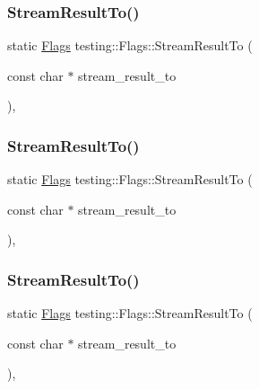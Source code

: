 \mbox{\label{structtesting_1_1_flags_a9cf0f64310b28eadbbfbb35584ebfc71}} 
\subsubsection{\texorpdfstring{StreamResultTo()}{StreamResultTo()}\hspace{0.1cm}{\footnotesize\ttfamily [1/3]}}
{\footnotesize\ttfamily static \mbox{\hyperlink{structtesting_1_1_flags}{Flags}} testing\+::\+Flags\+::\+Stream\+Result\+To (\begin{DoxyParamCaption}\item[{const char $\ast$}]{stream\+\_\+result\+\_\+to }\end{DoxyParamCaption})\hspace{0.3cm}{\ttfamily [inline]}, {\ttfamily [static]}}

\mbox{\label{structtesting_1_1_flags_a9cf0f64310b28eadbbfbb35584ebfc71}} 
\subsubsection{\texorpdfstring{StreamResultTo()}{StreamResultTo()}\hspace{0.1cm}{\footnotesize\ttfamily [2/3]}}
{\footnotesize\ttfamily static \mbox{\hyperlink{structtesting_1_1_flags}{Flags}} testing\+::\+Flags\+::\+Stream\+Result\+To (\begin{DoxyParamCaption}\item[{const char $\ast$}]{stream\+\_\+result\+\_\+to }\end{DoxyParamCaption})\hspace{0.3cm}{\ttfamily [inline]}, {\ttfamily [static]}}

\mbox{\label{structtesting_1_1_flags_a9cf0f64310b28eadbbfbb35584ebfc71}} 
\subsubsection{\texorpdfstring{StreamResultTo()}{StreamResultTo()}\hspace{0.1cm}{\footnotesize\ttfamily [3/3]}}
{\footnotesize\ttfamily static \mbox{\hyperlink{structtesting_1_1_flags}{Flags}} testing\+::\+Flags\+::\+Stream\+Result\+To (\begin{DoxyParamCaption}\item[{const char $\ast$}]{stream\+\_\+result\+\_\+to }\end{DoxyParamCaption})\hspace{0.3cm}{\ttfamily [inline]}, {\ttfamily [static]}}

